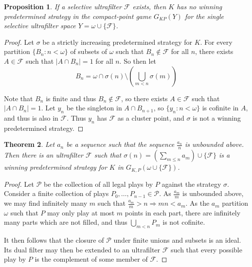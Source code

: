 \documentclass[11pt]{article}
\theoremstyle{plain}
\newtheorem{theorem}{Theorem}
\newtheorem{proposition}[theorem]{Proposition}
\theoremstyle{definition}
\theoremstyle{remark}
\begin{document}
\begin{proposition} 
If a selective ultrafilter $\mathcal{F}$ exists, then $K$ has no winning predetermined strategy in the compact-point game $G_{KP}(Y)$ for the single selective ultrafilter space $Y=\omega \cup \{\mathcal{F}\}$.
\end{proposition}

\begin{proof}
Let $\sigma$ be a strictly increasing predetermined strategy for $K$. For every partition $\{B_n : n < \omega\}$ of subsets of $\omega$ such that $B_n \not\in \mathcal{F}$ for all $n$, there exists $A \in \mathcal{F}$ such that $|A \cap B_n|=1$ for all $n$. So then let \[B_n = \omega \cap \sigma(n) \setminus \left(\bigcup_{m<n} \sigma(m)\right)\]
  
  Note that $B_n$ is finite and thus $B_n \not\in \mathcal{F}$, so there exists $A\in \mathcal{F}$ such that $|A \cap B_n|=1$. Let $y_n$ be the singleton in $A \cap B_{n+1}$, so $\{y_n : n < \omega\}$ is cofinite in $A$, and thus is also in $\mathcal{F}$. Thus $y_n$ has $\mathcal{F}$ as a cluster point, and $\sigma$ is not a  winning predetermined strategy.
\end{proof}

\begin{theorem}
Let $a_n$ be a sequence such that the sequence $\frac{a_n}{n}$ is unbounded above. Then there is an ultrafilter $\mathcal{F}$ such that $\sigma(n)=(\sum_{m\leq n} a_m )\cup \{\mathcal{F}\}$ is a winning predetermined strategy for $K$ in $G_{K,P}(\omega\cup\{\mathcal{F}\})$.
\end{theorem}

\begin{proof}
Let $\mathcal{P}$ be the collection of all legal plays by $P$ against the strategy $\sigma$. Consider a finite collection of plays $P_0,\dots,P_{n-1}\in \mathcal{P}$. As $\frac{a_m}{m}$ is unbounded above, we may find infinitely many $m$ such that $\frac{a_m}{m}>n \Rightarrow mn<a_m$. As the $a_m$ partition $\omega$ such that $P$ may only play at most $m$ points in each part, there are infinitely many parts which are not filled, and thus $\bigcup_{m<n} P_m$ is not cofinite.

It then follows that the closure of $\mathcal{P}$ under finite unions and subsets is an ideal. Its dual filter may then be extended to an ultrafilter $\mathcal{F}$ such that every possible play by $P$ is the complement of some member of $\mathcal{F}$.
\end{proof}
\end{document}
